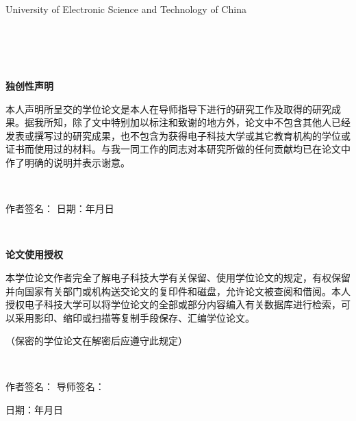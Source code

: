 {\begin{titlepage}
\begin{center}
{University of Electronic Science and Technology of China}\\
\vspace{3cm}
\\[1ex]
\\[1ex]
\\[1ex]
\\[1ex]
\end{center}
\newpage
\thispagestyle{empty}
\linespread{1.5}
\begin{center}
{\bf{}独创性声明}\par
\end{center}
{\qquad 本人声明所呈交的学位论文是本人在导师指导下进行的研究工作及取得的研究成果。据我所知，除了文中特别加以标注和致谢的地方外，论文中不包含其他人已经发表或撰写过的研究成果，也不包含为获得电子科技大学或其它教育机构的学位或证书而使用过的材料。与我一同工作的同志对本研究所做的任何贡献均已在论文中作了明确的说明并表示谢意。\par
~\par
作者签名：\makebox[5em][l]{\uline{\hfill}}\hfill
日期：\qquad{}年\qquad{}月\qquad{}日 \par
~\par
\begin{center}
{\bf{}论文使用授权}\par
\end{center}
{\qquad 本学位论文作者完全了解电子科技大学有关保留、使用学位论文的规定，有权保留并向国家有关部门或机构送交论文的复印件和磁盘，允许论文被查阅和借阅。本人授权电子科技大学可以将学位论文的全部或部分内容编入有关数据库进行检索，可以采用影印、缩印或扫描等复制手段保存、汇编学位论文。\par
（保密的学位论文在解密后应遵守此规定） \par
~\par
}
\qquad 作者签名：\makebox[5em][l]{\uline{\hfill}}\hfill
导师签名：\makebox[7em][l]{\uline{\hfill}}\par
\hfill 日期：\qquad{}年\qquad{}月\qquad{}日 \par
}
\linespread{1.391}
\end{titlepage}
}

